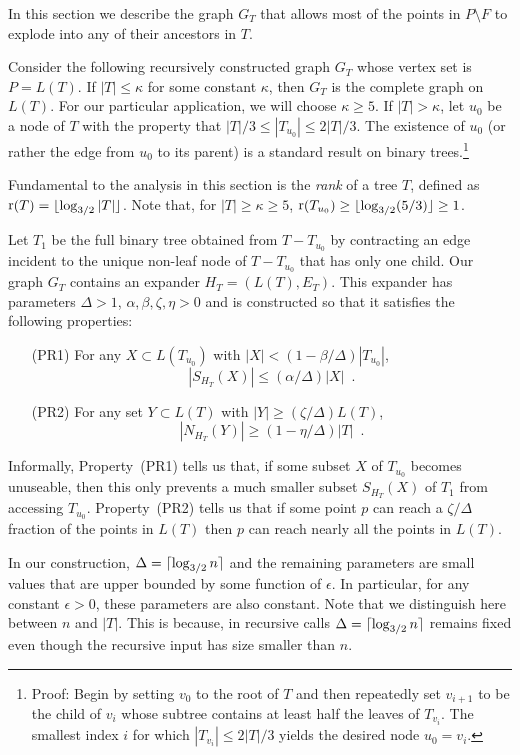 \documentclass{patmorin}
\DeclareMathOperator{\rank}{r}
\begin{document}
In this section we describe the graph $G_T$ that allows most of the
points in $P\setminus F$ to explode into any of their ancestors in $T$.

Consider the following recursively constructed graph $G_{T}$ whose vertex set
is $P=L(T)$.  If $|T| \le \kappa$ for some constant $\kappa$, then $G_T$
is the complete graph on $L(T)$. For our particular application, we will
choose $\kappa\ge 5$.  
If $|T|>\kappa$, let $u_0$ be a node of $T$ with the property that
$|T|/3\le |T_{u_0}|\le 2|T|/3$.  The existence of $u_0$ (or rather
the edge from $u_0$ to its parent) is a standard result on binary
trees.\footnote{Proof: Begin by setting $v_0$ to the root of $T$ and then
repeatedly set $v_{i+1}$ to be the child of $v_i$ whose subtree contains
at least half the leaves of $T_{v_i}$.  The smallest index $i$ for which
$|T_{v_i}|\le 2|T|/3$ yields the desired node $u_0=v_i$.} 

Fundamental to the analysis in this section is the \emph{rank} of a
tree $T$, defined as $\rank(T)=\floor{\log_{3/2}|T|}$.  Note that, for
$|T|\ge\kappa\ge 5$, $\rank(T_{u_0}) \ge \floor{\log_{3/2}(5/3)} \ge 1$.

Let $T_1$ be the full binary tree obtained from $T-T_{u_0}$ by contracting
an edge incident to the unique non-leaf node of $T-T_{u_0}$ that has only
one child.  Our graph $G_{T}$ contains an expander $H_T=(L(T),E_T)$. This
expander has parameters $\Delta>1$, $\alpha, \beta,\zeta,\eta > 0$ and is
constructed so that it satisfies the following properties:
\begin{enumerate}
  \item[(PR1)] For any $X\subset L(T_{u_0})$ with
    $|X|<(1-\beta/\Delta)|T_{u_0}|$, 
    \[ |S_{H_T}(X)|\le (\alpha/\Delta)|X| \enspace . \]

  \item[(PR2)] For any set $Y\subset L(T)$ with $|Y|\ge
    (\zeta/\Delta)L(T)$, \[ |N_{H_T}(Y)|\ge (1-\eta/\Delta)|T| \enspace .\]
\end{enumerate}
Informally, Property~(PR1) tells us that, if some subset $X$ of
$T_{u_0}$ becomes unuseable, then this only prevents a much smaller subset
$S_{H_T}(X)$ of $T_{1}$ from accessing $T_{u_0}$.  Property~(PR2) tells
us that if some point $p$ can reach a $\zeta/\Delta$ fraction of the
points in $L(T)$ then $p$ can reach nearly all the points in $L(T)$.

In our construction, $\Delta={\lceil \log_{3/2} n \rceil}$ and the remaining
parameters are small values that are upper bounded by some function
of $\epsilon$. In particular, for any constant $\epsilon >0$, these
parameters are also constant. Note that we distinguish here between $n$
and $|T|$. This is because, in recursive calls $\Delta={\lceil \log_{3/2} n \rceil}$
remains fixed even though the recursive input has size smaller than $n$.
\end{document}
